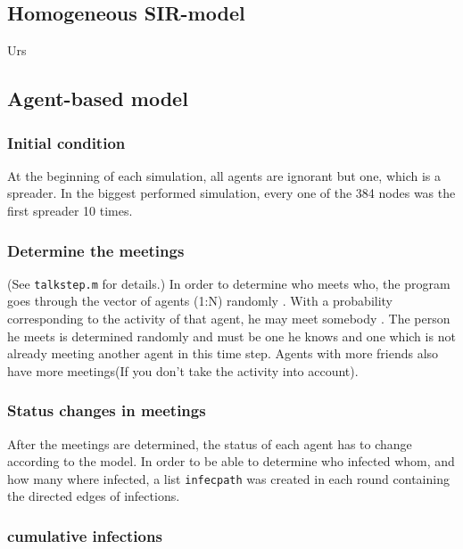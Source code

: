 \subsection{Homogeneous SIR-model}

Urs

\subsection{Agent-based model}

\subsubsection{Initial condition}

At the beginning of each simulation, all agents are ignorant but one, which is a spreader. In the biggest performed simulation, every one of the 384 nodes was the first spreader 10 times. 

\subsubsection{Determine the meetings}

(See \texttt{talkstep.m} for details.)
\newline
\newline
In order to determine who meets who, the program goes through the vector of agents (1:N) randomly . With a probability corresponding to the activity of that agent, he may meet somebody . The person he meets is determined randomly and must be one he knows and one which is not already meeting another agent in this time step. Agents with more friends also have more meetings(If you don't take the activity into account). 

\subsubsection{Status changes in meetings}

After the meetings are determined, the status of each agent has to change according to the model. In order to be able to determine who infected whom, and how many where infected, a list \texttt{infecpath} was created in each round containing the directed edges of infections.

\subsubsection{cumulative infections}

